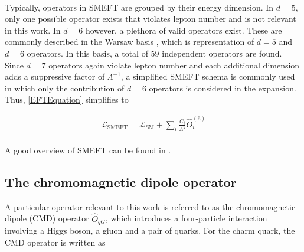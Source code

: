 \\
Typically, operators in SMEFT are grouped by their energy dimension. In $d=5$, only one possible operator exists that violates lepton number \cite{Weinberg:1979sa} and is not relevant in this work. In $d=6$ however, a plethora of valid operators exist. These are commonly described in the Warsaw basis \cite{WarsawBasis}, which is representation of $d=5$ and $d=6$ operators. In this basis, a total of 59 independent operators are found. Since $d=7$ operators again violate lepton number and each additional dimension adds a suppressive factor of $\Lambda^{-1}$, a simplified SMEFT schema is commonly used in which only the contribution of $d=6$ operators is considered in the expansion. Thus, \autoref{EFTEquation} simplifies to 

\begin{align}
    \mathcal{L_{\mathrm{SMEFT}}} = \mathcal{L_{\mathrm{SM}}} + \sum_i \frac{C_i}{\Lambda^{2}} \hat{O}_i^{(6)} \label{EFTEQuationDim6}
\end{align}
\\
A good overview of SMEFT can be found in \cite{SMEFTOverview}.
\\
\subsection{The chromomagnetic dipole operator}
\label{sec:CMDOperator}

A particular operator relevant to this work is referred to as the chromomagnetic dipole (CMD) operator $\hat{O}_{qG}$, which introduces a four-particle interaction involving a Higgs boson, a gluon and a pair of quarks. For the charm quark, the CMD operator is written as 

